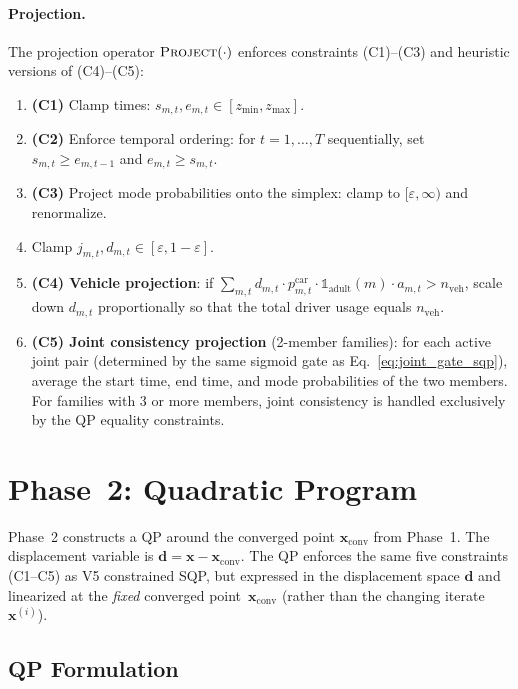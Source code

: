 \documentclass[11pt,a4paper]{article}
\newcommand{\indicator}{\mathbb{1}}
\newcommand{\xconv}{\mathbf{x}_{\mathrm{conv}}}
\begin{document}
\paragraph{Projection.}
The projection operator $\textsc{Project}(\cdot)$ enforces constraints (C1)--(C3) and heuristic versions of (C4)--(C5):
\begin{enumerate}
    \item \textbf{(C1)} Clamp times: $s_{m,t}, e_{m,t} \in [z_{\min}, z_{\max}]$.
    \item \textbf{(C2)} Enforce temporal ordering: for $t = 1, \dots, T$ sequentially, set $s_{m,t} \geq e_{m,t-1}$ and $e_{m,t} \geq s_{m,t}$.
    \item \textbf{(C3)} Project mode probabilities onto the simplex: clamp to $[\varepsilon, \infty)$ and renormalize.
    \item Clamp $j_{m,t}, d_{m,t} \in [\varepsilon, 1-\varepsilon]$.
    \item \textbf{(C4) Vehicle projection}: if $\sum_{m,t} d_{m,t} \cdot p^{\mathrm{car}}_{m,t} \cdot \indicator_{\mathrm{adult}}(m) \cdot a_{m,t} > n_{\mathrm{veh}}$, scale down $d_{m,t}$ proportionally so that the total driver usage equals $n_{\mathrm{veh}}$.
    \item \textbf{(C5) Joint consistency projection} (2-member families): for each active joint pair (determined by the same sigmoid gate as Eq.~\ref{eq:joint_gate_sqp}), average the start time, end time, and mode probabilities of the two members. For families with 3 or more members, joint consistency is handled exclusively by the QP equality constraints.
\end{enumerate}


\section{Phase~2: Quadratic Program}
\label{sec:phase2}

Phase~2 constructs a QP around the converged point $\xconv$ from Phase~1.
The displacement variable is $\mathbf{d} = \mathbf{x} - \xconv$.
The QP enforces the same five constraints (C1--C5) as V5 constrained SQP, but expressed in the displacement space $\mathbf{d}$ and linearized at the \emph{fixed} converged point~$\xconv$ (rather than the changing iterate~$\mathbf{x}^{(i)}$).

\subsection{QP Formulation}
\end{document}
